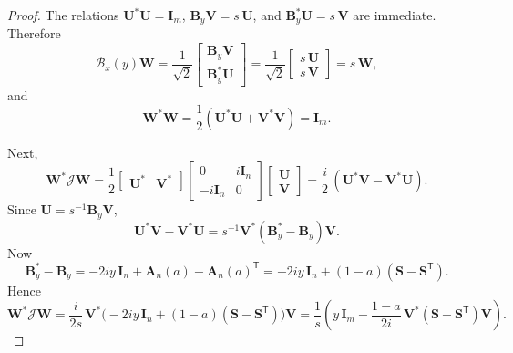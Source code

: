 \documentclass[11pt]{article}
\begin{document}
\begin{proof}
The relations \(\mathbf U^*\mathbf U=\mathbf I_m\), \(\mathbf B_y\mathbf V=s\,\mathbf U\), and \(\mathbf B_y^*\mathbf U=s\,\mathbf V\) are immediate. Therefore
\[
\mathcal B_x(y)\mathbf W
=
\frac{1}{\sqrt2}
\begin{bmatrix}
\mathbf B_y\mathbf V\\
\mathbf B_y^*\mathbf U
\end{bmatrix}
=
\frac{1}{\sqrt2}
\begin{bmatrix}
s\,\mathbf U\\
s\,\mathbf V
\end{bmatrix}
=
s\,\mathbf W,
\]
and
\[
\mathbf W^*\mathbf W
=
\frac12(\mathbf U^*\mathbf U+\mathbf V^*\mathbf V)
=
\mathbf I_m.
\]

Next,
\[
\mathbf W^*\mathcal J\mathbf W
=
\frac12
\begin{bmatrix}\mathbf U^* & \mathbf V^*\end{bmatrix}
\begin{bmatrix}
0 & i\mathbf I_n\\
-i\mathbf I_n & 0
\end{bmatrix}
\begin{bmatrix}\mathbf U\\ \mathbf V\end{bmatrix}
=
\frac{i}{2}\,(\mathbf U^*\mathbf V-\mathbf V^*\mathbf U).
\]
Since \(\mathbf U=s^{-1}\mathbf B_y\mathbf V\),
\[
\mathbf U^*\mathbf V-\mathbf V^*\mathbf U
=
s^{-1}\mathbf V^*(\mathbf B_y^*-\mathbf B_y)\mathbf V.
\]
Now
\[
\mathbf B_y^*-\mathbf B_y
=
-2iy\,\mathbf I_n+\mathbf A_n(a)-\mathbf A_n(a)^{\mathsf T}
=
-2iy\,\mathbf I_n+(1-a)(\mathbf S-\mathbf S^{\mathsf T}).
\]
Hence
\[
\mathbf W^*\mathcal J\mathbf W
=
\frac{i}{2s}\,
\mathbf V^*\bigl(-2iy\,\mathbf I_n+(1-a)(\mathbf S-\mathbf S^{\mathsf T})\bigr)\mathbf V
=
\frac1s
\left(
y\,\mathbf I_m
-
\frac{1-a}{2i}\,\mathbf V^*(\mathbf S-\mathbf S^{\mathsf T})\mathbf V
\right).
\]
\end{proof}
\end{document}
